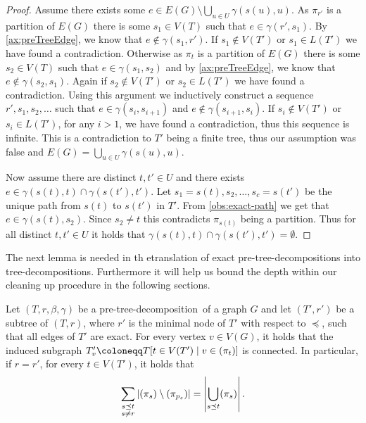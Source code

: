 \documentclass{lmcs}
\theoremstyle{plain}\newtheorem{claim}[thm]{Claim}   %
\let\boundary\relax
\newcommand{\boundary}{\Delta}
\newcommand{\preTreeDec}{pre-tree-decomposition}
\begin{document}
\begin{proof}
	Assume there exists some $e\in E(G)\setminus \bigcup_{u\in U} \gamma(s(u),u)$.
	As $\pi_{r'}$ is a partition of $E(G)$ there is some $s_1\in V(T)$ such that $e\in \gamma(r',s_1)$.
	By \ref{ax:preTreeEdge}, we know that $e\notin \gamma(s_1,r')$.
	If $s_1\notin V(T')$ or $s_1\in L(T')$ we have found a contradiction.
	Otherwise as $\pi_t$ is a partition of $E(G)$ there is some $s_2\in V(T)$ such that $e\in \gamma(s_1,s_2)$ and by \ref{ax:preTreeEdge}, we know that $e\notin \gamma(s_2,s_1)$.
	Again if $s_2\notin V(T')$ or $s_2\in L(T')$ we have found a contradiction.
	Using this argument we inductively construct a sequence $r',s_1,s_2,\ldots$ such that $e\in \gamma(s_i,s_{i+1})$ and $e\notin \gamma(s_{i+1},s_i)$.
	If $s_i\notin V(T')$ or $s_i\in L(T')$, for any $i>1$, we have found a contradiction, thus this sequence is infinite.
	This is a contradiction to $T'$ being a finite tree, thus our assumption was false and $E(G) = \bigcup_{u\in U} \gamma(s(u),u)$.
	
	Now assume there are distinct $t,t'\in U$ and there exists $e\in\gamma(s(t),t)\cap \gamma(s(t'),t')$.
	Let $s_1=s(t),s_2,\ldots,s_c=s(t')$ be the unique path from $s(t)$ to $s(t')$ in $T'$.
	From \autoref{obs:exact-path} we get that $e\in\gamma(s(t),s_2)$.
	Since $s_2\neq t$ this contradicts $\pi_{s(t)}$ being a partition.
	Thus for all distinct $t,t'\in U$ it holds that $\gamma(s(t),t)\cap \gamma(s(t'),t')=\emptyset$.
\end{proof}


The next lemma is needed in th etranslation of exact \preTreeDec s into tree-decompositions.
Furthermore it will help us bound the depth within our cleaning up procedure in the following sections.

\begin{lem}
	\label{obs:exact-subtree-depth}
	Let $(T,r,\beta,\gamma)$ be a \preTreeDec\ of a graph $G$ and let $(T',r')$ be a subtree of $(T,r)$, where $r'$ is the minimal node of $T'$ with respect to $\preceq$, such that all edges of $T'$ are exact.
	For every vertex $v\in V(G)$, it holds that the induced subgraph 
	$T'_v\coloneqq T[t\in V(T')\mid v\in \boundary(\pi_t)]$ is connected.
	In particular, if $r=r'$, for every $t\in V(T')$, it holds that
	\begin{equation*}
		\sum_{\substack{s\preceq t\\s\neq r}} \left\lvert \boundary(\pi_s) \setminus \boundary(\pi_{p_s}) \right\rvert
		= \left\lvert \bigcup_{s\preceq t} \boundary(\pi_s) \right\rvert.
	\end{equation*}
\end{lem}
\end{document}

